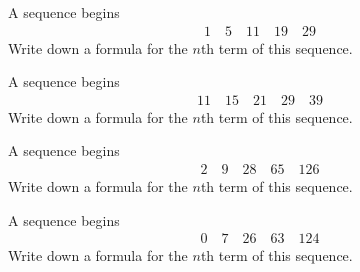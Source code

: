 \begin{tasks}
    \flushright {}

\task A sequence begins \\
      \begin{align*}
            1  \quad  5  \quad  11  \quad  19  \quad  29 
      \end{align*}       
    Write down a formula for the $n$th term of this sequence.       

    \flushright {}

\task A sequence begins \\
      \begin{align*}
            11  \quad  15  \quad  21  \quad  29  \quad  39 
      \end{align*}       
    Write down a formula for the $n$th term of this sequence.       

    \flushright {}

\task A sequence begins \\
      \begin{align*}
            2  \quad  9  \quad  28  \quad  65  \quad  126 
      \end{align*}       
    Write down a formula for the $n$th term of this sequence.       

    \flushright {}

\task A sequence begins \\
      \begin{align*}
            0  \quad  7  \quad  26  \quad  63  \quad  124 
      \end{align*}       
    Write down a formula for the $n$th term of this sequence.       

    \flushright {}





\end{tasks}

